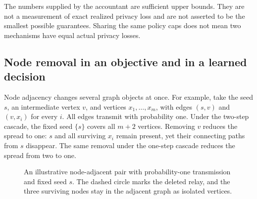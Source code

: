 The numbers supplied by the accountant are sufficient upper bounds. They are not a measurement of exact realized privacy loss and are not asserted to be the smallest possible guarantees. Sharing the same policy caps does not mean two mechanisms have equal actual privacy losses.

\subsection{Node removal in an objective and in a learned decision}
Node adjacency changes several graph objects at once. For example, take the seed $s$, an intermediate vertex $v$, and vertices $x_1,\ldots,x_m$, with edges $(s,v)$ and $(v,x_i)$ for every $i$. All edges transmit with probability one. Under the two-step cascade, the fixed seed $\{s\}$ covers all $m+2$ vertices. Removing $v$ reduces the spread to one: $s$ and all surviving $x_i$ remain present, yet their connecting paths from $s$ disappear. The same removal under the one-step cascade reduces the spread from two to one.

\begin{figure}[htbp]
\centering
{}
\caption[Effect of node removal at two diffusion horizons]{An illustrative node-adjacent pair with probability-one transmission and fixed seed $s$. The dashed circle marks the deleted relay, and the three surviving nodes stay in the adjacent graph as isolated vertices.}
\label{fig:relay-deletion}
\end{figure}

